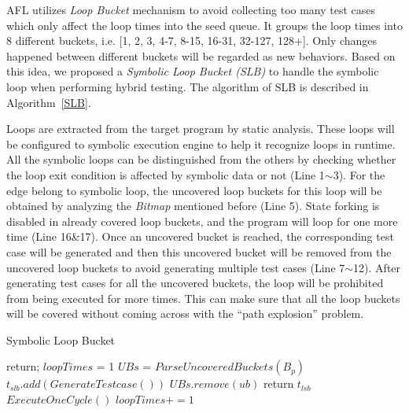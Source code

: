AFL utilizes \emph{Loop Bucket} mechanism to avoid collecting too many test cases which only affect the loop times into the seed queue. It groups the loop times into 8 different buckets, i.e. [1, 2, 3, 4-7, 8-15, 16-31, 32-127, 128+]. Only changes happened between different buckets will be regarded as new behaviors. Based on this idea, we proposed a \textit{Symbolic Loop Bucket (SLB)} to handle the symbolic loop when performing hybrid testing. The algorithm of SLB is described in Algorithm~\ref{SLB}.

Loops are extracted from the target program by static analysis. These loops will be configured to symbolic execution engine to help it recognize loops in runtime. All the symbolic loops can be distinguished from the others by checking whether the loop exit condition is affected by symbolic data or not (Line 1$\sim$3). For the edge belong to symbolic loop, the uncovered loop buckets for this loop will be obtained by analyzing the \textit{Bitmap} mentioned before (Line 5). 
State forking is disabled in already covered loop buckets, and the program will loop for one more time (Line 16\&17). Once an uncovered bucket is reached, the corresponding test case will be generated and then this uncovered bucket will be removed from the uncovered loop buckets to avoid generating multiple test cases (Line 7$\sim$12). After generating test cases for all the uncovered buckets, the loop will be prohibited from being executed for more times. This can make sure that all the loop buckets will be covered without coming across with the ``path explosion'' problem.

\begin{algorithm}
  \caption{Symbolic Loop Bucket}
  \label{SLB}
  {
    return;
  }
  $loopTimes$ = 1\;
  $UBs$ = $ParseUncoveredBuckets(B_p)$\;
  {
    {
      {
        $t_{slb}.add(GenerateTestcase())$\;
        $UBs$.$remove(ub)$\;
      }
    }
    {
      return $t_{lsb}$\;
    }{
      $ExecuteOneCycle()$\;
      $loopTimes += 1$\;
    }
  }
\end{algorithm}  

